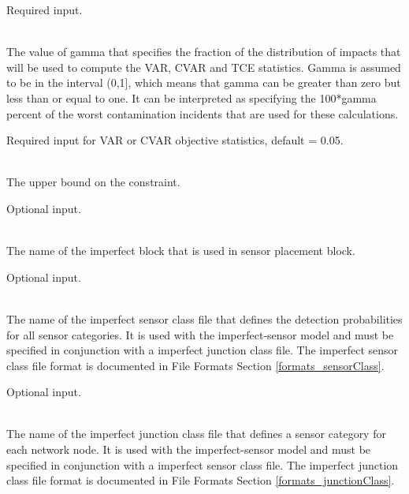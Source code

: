 \begin{description}[topsep=0pt,parsep=0.5em,itemsep=-0.4em]
\begin{description}[topsep=0pt,parsep=0.5em,itemsep=-0.4em]
                Required input.
    \item[{gamma}]\hfill
\\The value of gamma that specifies the fraction of the distribution of impacts that
                will be used to compute the VAR, CVAR and TCE statistics. Gamma
                is assumed to be in the interval (0,1], which means that gamma 
				can be greater than zero but less than or equal to one. It can be interpreted
                as specifying the 100*gamma percent of the worst contamination
                incidents that are used for these calculations.  
                
                Required input for VAR or CVAR objective statistics, default = 0.05.
    \item[{bound}]\hfill
\\The upper bound on the constraint.
                
                Optional input.
  \end{description}
  \item[{imperfect}]\hfill
  \begin{description}[topsep=0pt,parsep=0.5em,itemsep=-0.4em]
    \item[{name}]\hfill
\\The name of the imperfect block that is used in sensor placement block.
                
                Optional input.
    \item[{sensor class file}]\hfill
\\The name of the imperfect sensor class file that defines the detection probabilities
                for all sensor categories. It is used with the imperfect-sensor model 
                and must be specified in conjunction with a imperfect junction class file.
                The imperfect sensor class file format is documented in File Formats Section \ref{formats_sensorClass}.
                
                Optional input.
    \item[{junction class file}]\hfill
\\The name of the imperfect junction class file that defines a sensor category for
                each network node. It is used with the imperfect-sensor model and
                must be specified in conjunction with a imperfect sensor class file.
                The imperfect junction class file format is documented in File Formats Section \ref{formats_junctionClass}.
                

\end{description}
\end{description}
